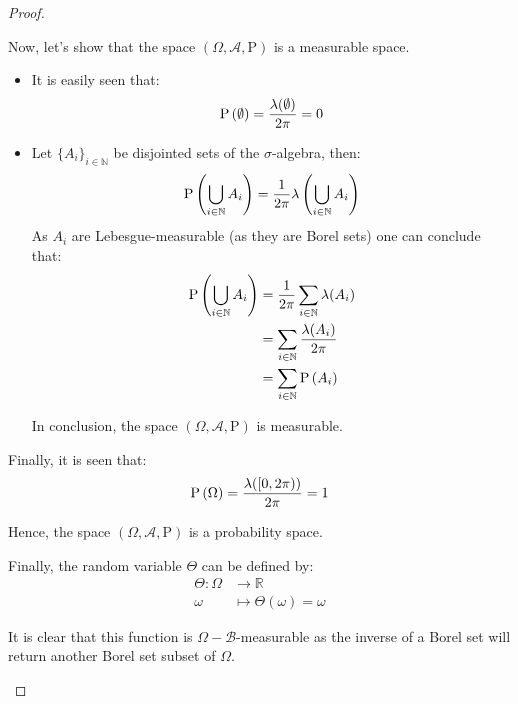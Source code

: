 \documentclass[11pt]{article}
\theoremstyle{definition}
\theoremstyle{remark}
\theoremstyle{remark}
\newcommand{\N}{\mathbb{N}}
\newcommand{\R}{{\mathbb{R}}}
\begin{document}
\begin{proof}
\begin{enumerate}[label=\alph*)]
      Now, let's show that the space
      $(\Omega, \mathcal{A}, \mathrm{P})$ is a measurable space.
      \begin{itemize}
      \item It is easily seen that:
        \begin{equation*}
          \P{\emptyset} = \frac{\lambda(\emptyset)}{2 \pi} = 0
        \end{equation*}

      \item Let $\{A_i\}_{i \in \N}$ be disjointed sets of the
        $\sigma$-algebra, then:
        \begin{equation*}
          \P{\bigcup_{i \in \N} A_i} = \frac{1}{2\pi} \lambda\left(\bigcup_{i \in \N} A_i\right)
        \end{equation*}
        As $A_i$ are Lebesgue-measurable (as they are Borel sets) one
        can conclude that:
        \begin{align*}
          \P{\bigcup_{i \in \N} A_i} &= \frac{1}{2\pi}\sum_{i \in \N} \lambda(A_i) \\
                                     &= \sum_{i \in \N} \frac{\lambda(A_i)}{2\pi} \\
                                     &= \sum_{i \in \N} \P{A_i}
        \end{align*}

        In conclusion, the space $(\Omega, \mathcal{A}, \mathrm{P})$
        is measurable.
      \end{itemize}

      Finally, it is seen that:
      \begin{equation*}
        \P{\Omega} = \frac{\lambda([0, 2\pi))}{2\pi} = 1
      \end{equation*}

      Hence, the space $(\Omega, \mathcal{A}, \mathrm{P})$ is a
      probability space.

      Finally, the random variable $\Theta$ can be defined by:
      \begin{align*}
        \Theta : \Omega& \rightarrow \R \\
        \omega& \mapsto \Theta(\omega) = \omega
      \end{align*}

      It is clear that this function is
      $\Omega - \mathcal{B}$-measurable as the inverse of a Borel set
      will return another Borel set subset of $\Omega$.


\end{enumerate}
\end{proof}
\end{document}
